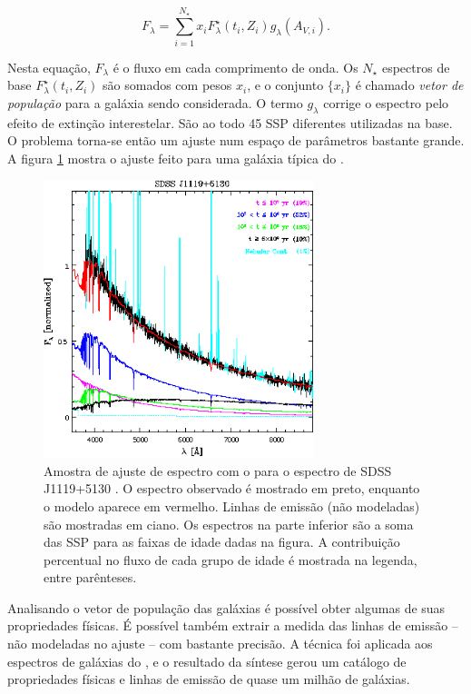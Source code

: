 $$ F_\lambda = \sum_{i=1}^{N_\star} x_i F^\star_\lambda(t_i,Z_i)
g_\lambda(A_{V,i}). $$

Nesta equação, $F_\lambda$ é o fluxo em cada comprimento de onda. Os $N_\star$
espectros de base $F^\star_\lambda(t_i, Z_i)$ são somados com pesos $x_i$, e o
conjunto $\{x_i\}$ é chamado {\em vetor de população} para a galáxia sendo
considerada. O termo $g_\lambda$ corrige o espectro pelo efeito de extinção
interestelar. São ao todo 45 SSP diferentes utilizadas na base. O problema
torna-se então um ajuste num espaço de parâmetros bastante grande. A figura
\ref{fig:StarlightSpectrumSample} mostra o ajuste feito para uma galáxia típica
do \SDSS.

\begin{figure}
	\includegraphics[width=0.7\textwidth]{figuras/starlight-fit.eps}
	\caption[Amostra de ajuste de espectro com o \starlight.]
	{Amostra de ajuste de espectro com o \starlight para o espectro de SDSS
	J1119+5130 \citep[figura 2]{CidFernandes2006}. O espectro observado é mostrado
	em preto, enquanto o modelo aparece em vermelho. Linhas de emissão (não
	modeladas) são mostradas em ciano. Os espectros na parte inferior são a soma
	das SSP para as faixas de idade dadas na figura. A contribuição percentual no
	fluxo de cada grupo de idade é mostrada na legenda, entre parênteses.}
	\label{fig:StarlightSpectrumSample}
\end{figure}

Analisando o vetor de população das galáxias é possível obter algumas de suas
propriedades físicas. É possível também extrair a medida das linhas de emissão
-- não modeladas no ajuste -- com bastante precisão. A técnica foi aplicada aos
espectros de galáxias do \SDSS, e o resultado da síntese gerou um catálogo de
propriedades físicas e linhas de emissão de quase um milhão de galáxias.


